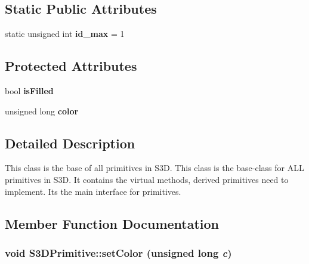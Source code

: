 \subsection*{Static Public Attributes}
\begin{DoxyCompactItemize}
\item 
\hypertarget{class_s3_d_primitive_a08ee26517002051f19202d8b62bf2b46}{
static unsigned int {\bfseries id\_\-max} = 1}
\label{class_s3_d_primitive_a08ee26517002051f19202d8b62bf2b46}

\end{DoxyCompactItemize}
\subsection*{Protected Attributes}
\begin{DoxyCompactItemize}
\item 
\hypertarget{class_s3_d_primitive_ae5b091719cc1afa825a4ba0e1dfce670}{
bool {\bfseries isFilled}}
\label{class_s3_d_primitive_ae5b091719cc1afa825a4ba0e1dfce670}

\item 
\hypertarget{class_s3_d_primitive_afc81699d5253aab2757a2c5e33848a22}{
unsigned long {\bfseries color}}
\label{class_s3_d_primitive_afc81699d5253aab2757a2c5e33848a22}

\end{DoxyCompactItemize}


\subsection{Detailed Description}
This class is the base of all primitives in S3D. This class is the base-\/class for ALL primitives in S3D. It contains the virtual methods, derived primitives need to implement. Its the main interface for primitives. 

\subsection{Member Function Documentation}
\hypertarget{class_s3_d_primitive_a1c8f036193987522bdfb6a49b9b74000}{
\subsubsection[{setColor}]{\setlength{\rightskip}{0pt plus 5cm}void S3DPrimitive::setColor (unsigned long {\em c})}}
\label{class_s3_d_primitive_a1c8f036193987522bdfb6a49b9b74000}


